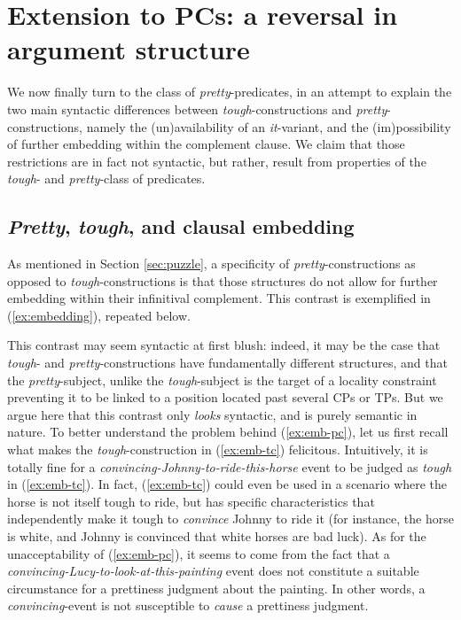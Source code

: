 \documentclass[11pt]{article}
\begin{document}
\section{Extension to PCs: a reversal in argument structure}\label{sec:pretty-constructions}
We now finally turn to the class of \textit{pretty}-predicates, in an attempt to explain the two main syntactic differences between \textit{tough}-constructions and \textit{pretty}-constructions, namely the (un)availability of an \textit{it}-variant, and the (im)possibility of further embedding within the complement clause. We claim that those restrictions are in fact not syntactic, but rather, result from properties of the \textit{tough}- and \textit{pretty}-class of predicates.

\subsection{\textit{Pretty}, \textit{tough}, and clausal embedding}\label{sec:pretty-tough-embedding}
As mentioned in Section \ref{sec:puzzle}, a specificity of \textit{pretty}-constructions as opposed to \textit{tough}-constructions is that those structures do not allow for further embedding within their infinitival complement. This contrast is exemplified in (\ref{ex:embedding}), repeated below.
\begin{exe}
	\begin{xlist}
	\end{xlist}
\end{exe}
This contrast may seem syntactic at first blush: indeed, it may be the case that \textit{tough}- and \textit{pretty}-constructions have fundamentally different structures, and that the \textit{pretty}-subject, unlike the \textit{tough}-subject is the target of a locality constraint preventing it to be linked to a position located past several CPs or TPs. But we argue here that this contrast only \textit{looks} syntactic, and is purely semantic in nature.
To better understand the problem behind (\ref{ex:emb-pc}), let us first recall what makes the \textit{tough}-construction in (\ref{ex:emb-tc}) felicitous. Intuitively, it is totally fine for a \textit{convincing-Johnny-to-ride-this-horse} event to be judged as \textit{tough} in (\ref{ex:emb-tc}). In fact, (\ref{ex:emb-tc}) could even be used in a scenario where the horse is not itself tough to ride, but has specific characteristics that independently make it tough to \textit{convince} Johnny to ride it (for instance, the horse is white, and Johnny is convinced that white horses are bad luck). As for the unacceptability of (\ref{ex:emb-pc}), it seems to come from the fact that a \textit{convincing-Lucy-to-look-at-this-painting} event does not constitute a suitable circumstance for a prettiness judgment about the painting. In other words, a \textit{convincing}-event is not susceptible to \textit{cause} a prettiness judgment.\\
\end{document}
